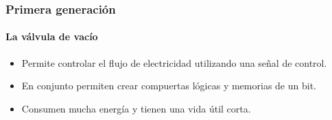 \documentclass[11pt,a4paper,spanish]{beamer}
\begin{document}
\begin{frame}

\frametitle{Primera generación}
\framesubtitle{La válvula de vacío}

\begin{minipage}{0.66\textwidth}

    \begin{itemize}
        \item Permite controlar el flujo de electricidad utilizando una señal
            de control.
        \item En conjunto permiten crear compuertas lógicas y memorias de un
            bit.
        \item Consumen mucha energía y tienen una vida útil corta.
    \end{itemize}

\end{minipage}
~
\begin{minipage}{0.3\textwidth}


\end{minipage}
\end{frame}
\end{document}
